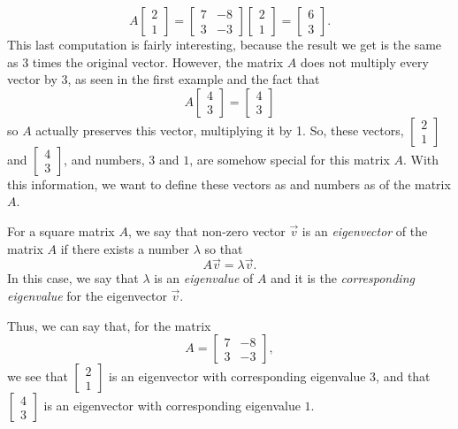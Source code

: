 \[ A\begin{bmatrix} 2 \\ 1\end{bmatrix} = \begin{bmatrix} 7 & -8 \\ 3 & -3 \end{bmatrix}\begin{bmatrix} 2 \\ 1\end{bmatrix} = \begin{bmatrix} 6\\ 3 \end{bmatrix}. \] This last computation is fairly interesting, because the result we get is the same as 3 times the original vector. However, the matrix $A$ does not multiply every vector by 3, as seen in the first example and the fact that \[ A\begin{bmatrix} 4 \\ 3 \end{bmatrix} = \begin{bmatrix} 4 \\ 3 \end{bmatrix} \] so $A$ actually preserves this vector, multiplying it by 1. So, these vectors, $\begin{bmatrix} 2 \\ 1 \end{bmatrix}$ and $\begin{bmatrix} 4 \\ 3 \end{bmatrix}$, and numbers, $3$ and $1$, are somehow special for this matrix $A$. With this information, we want to define these vectors as \emph{} and numbers as \emph{} of the matrix $A$.

\begin{definition}
For a square matrix $A$, we say that non-zero vector $\vec{v}$ is an \emph{eigenvector} of the matrix $A$ if there exists a number $\lambda$ so that \[ A \vec{v} = \lambda\vec{v}. \] In this case, we say that $\lambda$ is an \emph{eigenvalue} of $A$ and it is the \emph{corresponding eigenvalue} for the eigenvector $\vec{v}$. 
\end{definition}

Thus, we can say that, for the matrix \[ A = \begin{bmatrix} 7 & -8 \\ 3 & -3 \end{bmatrix}, \] we see that $\begin{bmatrix}2 \\ 1 \end{bmatrix}$ is an eigenvector with corresponding eigenvalue $3$, and that $\begin{bmatrix}4 \\ 3 \end{bmatrix}$ is an eigenvector with corresponding eigenvalue $1$.

